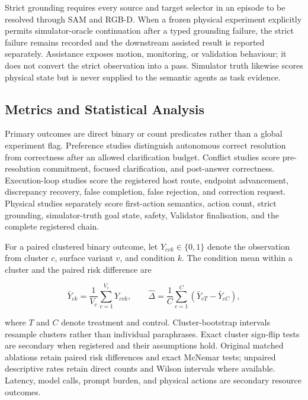 \documentclass{article}
\begin{document}
Strict grounding requires every source and target selector in an episode to be
resolved through SAM and RGB-D. When a frozen physical experiment explicitly
permits simulator-oracle continuation after a typed grounding failure, the
strict failure remains recorded and the downstream assisted result is reported
separately. Assistance exposes motion, monitoring, or validation behaviour; it
does not convert the strict observation into a pass. Simulator truth likewise
scores physical state but is never supplied to the semantic agents as task
evidence.

\subsection{Metrics and Statistical Analysis}
\label{subsec:evaluation-statistics}

Primary outcomes are direct binary or count predicates rather than a global
experiment flag. Preference studies distinguish autonomous correct resolution
from correctness after an allowed clarification budget. Conflict studies score
pre-resolution commitment, focused clarification, and post-answer correctness.
Execution-loop studies score the registered host route, endpoint advancement,
discrepancy recovery, false completion, false rejection, and correction
request. Physical studies separately score first-action semantics, action
count, strict grounding, simulator-truth goal state, safety, Validator
finalisation, and the complete registered chain.

For a paired clustered binary outcome, let $Y_{cvk}\in\{0,1\}$ denote the
observation from cluster $c$, surface variant $v$, and condition $k$. The
condition mean within a cluster and the paired risk difference are

\begin{equation}
    \bar{Y}_{ck}
    = \frac{1}{V_c}\sum_{v=1}^{V_c}Y_{cvk},
    \qquad
    \widehat{\Delta}
    = \frac{1}{C}\sum_{c=1}^{C}
      \left(\bar{Y}_{cT}-\bar{Y}_{cC}\right),
    \label{eq:cluster-risk-difference}
\end{equation}

where $T$ and $C$ denote treatment and control. Cluster-bootstrap intervals
resample clusters rather than individual paraphrases. Exact cluster sign-flip
tests are secondary when registered and their assumptions hold. Original
matched ablations retain paired risk differences and exact McNemar tests;
unpaired descriptive rates retain direct counts and Wilson intervals where
available. Latency, model calls, prompt burden, and physical actions are
secondary resource outcomes.
\end{document}
